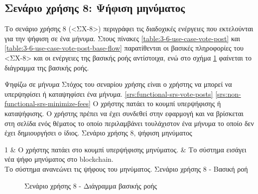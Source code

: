 \subsection{Σενάριο χρήσης 8: Ψήφιση μηνύματος} \label{subsection:3-6-use-case-vote-post}

Το σενάριο χρήσης 8 (<ΣΧ-8>) περιγράφει τις διαδοχικές ενέργειες που εκτελούνται για την ψήφιση σε ένα μήνυμα. Στους πίνακες \ref{table:3-6-use-case-vote-post} και \ref{table:3-6-use-case-vote-post-base-flow} παρατίθενται οι βασικές πληροφορίες του <ΣΧ-8> και οι ενέργειες της βασικής ροής αντίστοιχα, ενώ στο σχήμα \ref{figure:3-6-use-case-vote-post-base-flow-sequence-diagram} φαίνεται το διάγραμμα της βασικής ροής.

\useCaseTable
{Ψηφίζω σε μήνυμα}
{Στόχος του σεναρίου χρήσης είναι ο χρήστης να μπορεί να υπερψηφίσει ή καταψηφίσει ένα μήνυμα.}
{\ref{srs:functional-srs-vote-posts}}
{\ref{srs:non-functional-srs-minimize-fees}}
{Ο χρήστης πατάει το κουμπί υπερψήφισης ή καταψήφισης.}
{Ο χρήστης πρέπει να έχει συνδεθεί στην εφαρμογή και να βρίσκεται στη σελίδα ενός θέματος το οποίο περιλαμβάνει τουλάχιστον ένα μήνυμα το οποίο δεν έχει δημιουργήσει ο ίδιος.}
{Σενάριο χρήσης 8, ψήφιση μηνύματος}
{\label{table:3-6-use-case-vote-post}}


\useCaseBaseFlowTable
{
    1 & Ο χρήστης πατάει στο κουμπί υπερψήφισης μηνύματος. & Το σύστημα εισάγει νέα ψήφο μηνύματος στο blockchain. \\ [0.5ex]
}
{Το σύστημα ανανεώνει τις ψήφους του μηνύματος.}
{Σενάριο χρήσης 8 - Βασική ροή}
{\label{table:3-6-use-case-vote-post-base-flow}}

\begin{figure}[H]
    \centering
    
    \caption{Σενάριο χρήσης 8 - Διάγραμμα βασικής ροής}
    \label{figure:3-6-use-case-vote-post-base-flow-sequence-diagram}
\end{figure}
